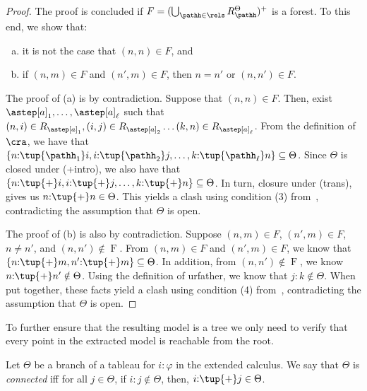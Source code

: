 \begin{proof}
    The proof is concluded if $F = (\bigcup_{\pathh\in\rels} R_{\pathh}^{\Theta})^{+}$ is a forest.
    To this end, we show that:
    \begin{enumerate}[(a)]
    \item it is not the case that $(n,n) \in \mathbin{F}$, and
    \item if $(n,m)\in \mathbin{F}$ and $(n',m) \in \mathbin{F}$, then $n = n'$ or $(n,n') \in \mathbin{F}$.
    \end{enumerate} 

    The proof of (a) is by contradiction.
    Suppose that $(n,n)\in \mathbin{F}$.
    Then, exist $\astep[a]_1,\ldots,\astep[a]_{\ell}$ such that
        $(n,i)\in R_{\astep[a]_1}, (i,j)\in R_{\astep[a]_2} \ldots (k,n)\in R_{\astep[a]_{\ell}}$.
    From the definition of $\cra$, we have that ${\{n{:}\tup{\pathh_1} i, i{:}\tup{\pathh_2}j,\ldots,k{:}\tup{\pathh_{\ell}} n\}\subseteq\Theta}$.
    Since $\Theta$ is closed under (+intro), we also have that $\{n{:}\tup{+} i, i{:}\tup{+}j,\ldots,k{:}\tup{+} n\}\subseteq\Theta$.
    In turn, closure under (trans), gives us ${n{:}\tup{+} n}\in \Theta$.
    This yields a clash using condition (3) from~, contradicting the assumption that $\Theta$ is open.

    The proof of (b) is also by contradiction.
    Suppose $(n,m)\in \mathbin{F}$, $(n',m) \in \mathbin{F}$, $n \neq n'$, and $(n,n')\notin\mathrel{F}$.
    From $(n,m)\in \mathbin{F}$ and $(n',m)\in \mathbin{F}$, we know that $\{n{:}\tup{+}m,n'{:}\tup{+}m\} \subseteq \Theta$.
    In addition, from $(n,n')\notin \mathrel{F}$, we know $n{:}\tup{+}n' \notin \Theta$.
    Using the definition of urfather, we know that $j{:}k \notin \Theta$.
    When put together, these facts yield a clash using condition (4) from~, contradicting the assumption that $\Theta$ is open.
\end{proof}

To further ensure that the resulting model is a tree we only need 
to verify that every point in the extracted model is reachable from 
the root. 

\begin{defi}
    \label{def:connected}
    Let $\Theta$ be a branch of a tableau for $i{:}\varphi$ in the extended calculus. We say that $\Theta$
    is {\em connected} iff for all $j\in\Theta$, if $i{:}j \notin \Theta$, then, $i{:}\tup{+}j \in \Theta$.
\end{defi}

